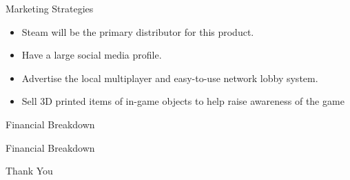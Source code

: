 \documentclass{beamer}
\begin{document}
\begin{frame}{Marketing Strategies}
	\begin{itemize}		
	\item Steam will be the primary distributor for this product.\pause
	\item Have a large social media profile. \pause
	\item Advertise the local multiplayer and easy-to-use network lobby system. \pause
	\item Sell 3D printed items of in-game objects to help raise awareness of the game \pause
	\end{itemize}
\end{frame}

\begin{frame}{Financial Breakdown}
\end{frame}

\begin{frame}{Financial Breakdown}
\end{frame}



\begin{frame}{Thank You}
\end{frame}
\end{document}
